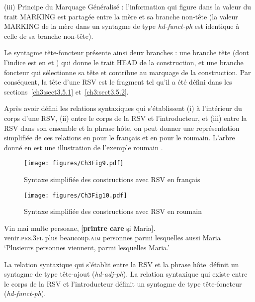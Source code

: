(iii) Principe du Marquage Généralisé : l’information qui figure dans la valeur du trait MARKING est partagée entre la mère et sa branche non-tête (la valeur MARKING de la mère dans un syntagme de type \textit{hd-funct-ph} est identique à celle de sa branche non-tête).  

Le syntagme tête-foncteur présente ainsi deux branches : une branche tête (dont l’indice est  en  et ) qui donne le trait HEAD de la construction, et une branche foncteur qui sélectionne sa tête et contribue au marquage de la construction. Par conséquent, la tête d’une RSV est le fragment tel qu’il a été défini dans les sections~\ref{ch3:sect3.5.1} et~\ref{ch3:sect3.5.2}.

\largerpage 
Après avoir défini les relations syntaxiques qui s’établissent (i) à l’intérieur du corps d’une RSV, (ii) entre le corps de la RSV et l’introducteur, et (iii) entre la RSV dans son ensemble et la phrase hôte, on peut donner une représentation simplifiée de ces relations en  pour le français et en  pour le roumain. L’arbre donné en  est une illustration de l’exemple roumain . 

\begin{figure}
\texttt{[image: figures/Ch3Fig9.pdf]} %
\caption{Syntaxe simplifiée des constructions avec RSV en français}
\label{ch3:fig9}
\end{figure}

\begin{figure}
\texttt{[image: figures/Ch3Fig10.pdf]} %
\caption{Syntaxe simplifiée des constructions avec RSV en roumain}
\label{ch3:fig10}
\end{figure}

\ea \label{ch3:ex133}
\gll Vin  mai  multe  persoane,  [\textbf{printre} \textbf{care}  şi  Maria].\\
venir.\textsc{prs.3pl}  plus  beaucoup.\textsc{adj} personnes  parmi  lesquelles  aussi  Maria\\
\glt ‘Plusieurs personnes viennent, parmi lesquelles Maria.’  
\z

La relation syntaxique qui s’établit entre la RSV et la phrase hôte~définit un syntagme de type tête-ajout (\textit{hd-adj-ph}). La relation syntaxique qui existe entre le corps de la RSV et l’introducteur définit un syntagme de type tête-foncteur (\textit{hd-funct-ph}). 


